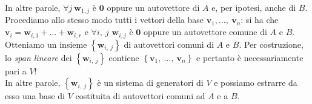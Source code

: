 \begin{demonstration}
\begin{equation*}
\end{equation*}
In altre parole, $\forall j\ \mathbf{w}_{1,j}$ è $\mathbf{0}$ oppure un autovettore di $A$ e, per ipotesi, anche di $B$. Procediamo allo stesso modo tutti i vettori della base $\mathbf{v}_1, \ldots,\ \mathbf{v}_n$: si ha che $\mathbf{v}_i=\mathbf{w}_{i,1}+\ldots+\mathbf{w}_{i,r}$ e $\forall i,\ j$ $\mathbf{w}_{i,j}$ è $\mathbf{0}$ oppure un autovettore comune di $A$ e $B$.\\
Otteniamo un insieme $\left\{\mathbf{w}_{i,\ j}\right\}$ di autovettori comuni di $A$ e $B$. Per costruzione, lo \textit{span lineare} dei $\left\{\mathbf{w}_{i,\ j}\right\}$ contiene $\left\{\mathbf{v}_1,\ \ldots,\ \mathbf{v}_n\right\}$ e pertanto è necessariamente pari a $V$!\\
In altre parole, $\left\{\mathbf{w}_{i,\ j}\right\}$ è un sistema di generatori di $V$ e possiamo estrarre da esso una base di $V$ costituita di autovettori comuni ad $A$ e a $B$.
\end{demonstration}
